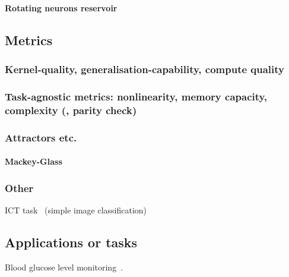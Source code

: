 \paragraph{Rotating neurons reservoir}
\cite{RotatingNeuronsRC}
\subsection{Metrics} \label{sec:1:RC_metrics}
\subsubsection{Kernel-quality, generalisation-capability, compute quality} \label{sec:1:RC_metrics_KQ}
\cite{RC_ASI}
\subsubsection{Task-agnostic metrics: nonlinearity, memory capacity, complexity (, parity check)}
\subsubsection{Attractors etc.} %
\paragraph{Mackey-Glass}
\subsubsection{Other} %
ICT task~\cite{farronato2022reservoir,grollier2020neuromorphic} (simple image classification) %
\subsection{Applications or tasks}
Blood glucose level monitoring~\cite{FewMoleculeReservoir}.
